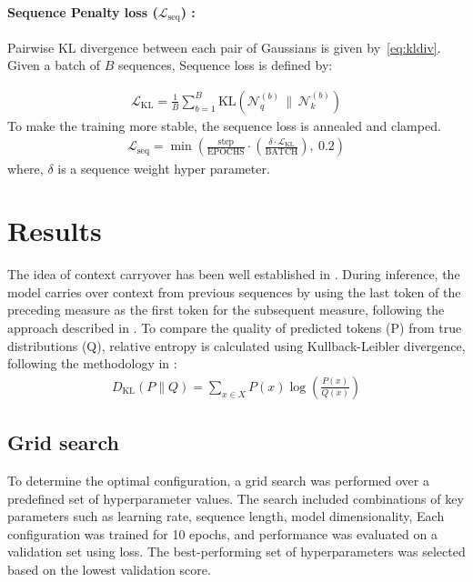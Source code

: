 \documentclass{article}
\begin{document}
\paragraph{Sequence Penalty loss ($\mathcal{L}_{\text{seq}}$) : }
Pairwise KL divergence between each pair of Gaussians is given by~\eqref{eq:kldiv}. 
Given a batch of \( B \) sequences, Sequence loss is defined by:

\begin{align}
\mathcal{L}_{\text{KL}} = \frac{1}{B} \sum_{b=1}^B \text{KL}(\mathcal{N}_q^{(b)} \,\|\, \mathcal{N}_k^{(b)})
\end{align}
To make the training more stable, the sequence loss is annealed and clamped. 
\begin{align}
\mathcal{L}_{\text{seq}} = \min\left( \frac{\text{step}}{\text{EPOCHS}} \cdot \left( \frac{\delta \cdot \mathcal{L}_{\text{KL}}}{\text{BATCH}} \right),\ 0.2 \right)
\end{align}
where, $\delta$ is a sequence weight hyper parameter.

\section{Results}\label{sec:results}
The idea of context carryover has been well established in \cite{llmgate} \cite{wei2021attentivecontextualcarryovermultiturn} \cite{pmlr-v267-chen25cg}
\cite{rae2019compressivetransformerslongrangesequence} \cite{beltagy2020longformerlongdocumenttransformer} \cite{zaheer2021bigbirdtransformerslonger}. 
During inference, the model carries over context from previous sequences by 
using the last token of the preceding measure as the first token for the 
subsequent measure, following the approach described in \cite{remi}.
To compare the quality of predicted tokens (P)  from true distributions (Q), 
relative entropy is calculated using Kullback-Leibler divergence, following the methodology in
\cite{Seo2016} \cite{zhang2025aestheticshumanpreferencescomparative} \cite{spiliopoulou2011comparingprobabilisticmodelsmelodic}:
\begin{align}
D_{\mathrm{KL}}(P \parallel Q) = \sum_{x \in X} P(x) \log \left( \frac{P(x)}{Q(x)} \right)
\end{align}
\subsection{Grid search}
To determine the optimal configuration, a grid search was performed over a predefined set of hyperparameter values. 
The search included combinations of key parameters such as learning rate, sequence length, model dimensionality, 
Each configuration was trained for 10 epochs, and performance was evaluated on a validation set using loss. 
The best-performing set of hyperparameters was selected based on the lowest validation score.
\end{document}
